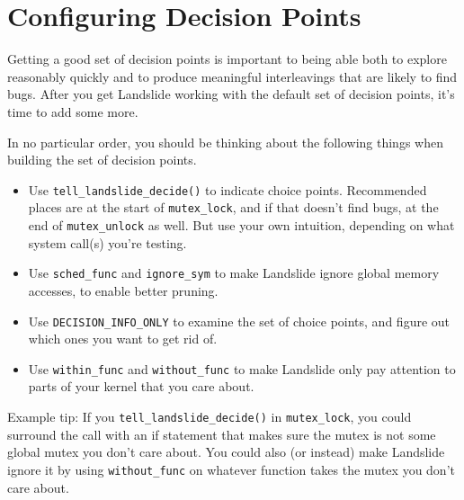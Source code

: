 \documentclass{article}
\begin{document}
\section{Configuring Decision Points}
\label{sec:choice}

Getting a good set of decision points is important to being able both to explore reasonably quickly and to produce meaningful interleavings that are likely to find bugs. After you get Landslide working with the default set of decision points, it's time to add some more.

In no particular order, you should be thinking about the following things when building the set of decision points.

\begin{itemize}
	\item Use \texttt{tell\_landslide\_decide()} to indicate choice points. Recommended places are at the start of \texttt{mutex\_lock}, and if that doesn't find bugs, at the end of \texttt{mutex\_unlock} as well. But use your own intuition, depending on what system call(s) you're testing.
	\item Use \texttt{sched\_func} and \texttt{ignore\_sym} to make Landslide ignore global memory accesses, to enable better pruning.
	\item Use \texttt{DECISION\_INFO\_ONLY} to examine the set of choice points, and figure out which ones you want to get rid of.
	\item Use \texttt{within\_func} and \texttt{without\_func} to make Landslide only pay attention to parts of your kernel that you care about.
\end{itemize}

Example tip: If you \texttt{tell\_landslide\_decide()} in \texttt{mutex\_lock}, you could surround the call with an if statement that makes sure the mutex is not some global mutex you don't care about. You could also (or instead) make Landslide ignore it by using \texttt{without\_func} on whatever function takes the mutex you don't care about.

\end{document}
